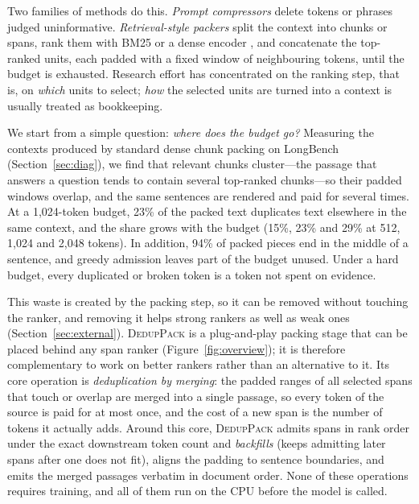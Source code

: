 \documentclass[11pt]{article}
\newcommand{\spk}{\textsc{DedupPack}}
\begin{document}
Two families of methods do this. \emph{Prompt compressors} \citep{li2023selectivecontext,jiang2023llmlingua,jiang2024longllmlingua,pan2024llmlingua2} delete tokens or phrases judged uninformative. \emph{Retrieval-style packers} split the context into chunks or spans, rank them with BM25 or a dense encoder \citep{robertson2009probabilistic,karpukhin2020dense,xiao2023cpack}, and concatenate the top-ranked units, each padded with a fixed window of neighbouring tokens, until the budget is exhausted. Research effort has concentrated on the ranking step, that is, on \emph{which} units to select; \emph{how} the selected units are turned into a context is usually treated as bookkeeping.

We start from a simple question: \emph{where does the budget go?} Measuring the contexts produced by standard dense chunk packing on LongBench (Section~\ref{sec:diag}), we find that relevant chunks cluster---the passage that answers a question tends to contain several top-ranked chunks---so their padded windows overlap, and the same sentences are rendered and paid for several times. At a 1,024-token budget, 23\% of the packed text duplicates text elsewhere in the same context, and the share grows with the budget (15\%, 23\% and 29\% at 512, 1,024 and 2,048 tokens). In addition, 94\% of packed pieces end in the middle of a sentence, and greedy admission leaves part of the budget unused. Under a hard budget, every duplicated or broken token is a token not spent on evidence.

This waste is created by the packing step, so it can be removed without touching the ranker, and removing it helps strong rankers as well as weak ones (Section~\ref{sec:external}). \spk{} is a plug-and-play packing stage that can be placed behind any span ranker (Figure~\ref{fig:overview}); it is therefore complementary to work on better rankers rather than an alternative to it. Its core operation is \emph{deduplication by merging}: the padded ranges of all selected spans that touch or overlap are merged into a single passage, so every token of the source is paid for at most once, and the cost of a new span is the number of tokens it actually adds. Around this core, \spk{} admits spans in rank order under the exact downstream token count and \emph{backfills} (keeps admitting later spans after one does not fit), aligns the padding to sentence boundaries, and emits the merged passages verbatim in document order. None of these operations requires training, and all of them run on the CPU before the model is called.
\end{document}
